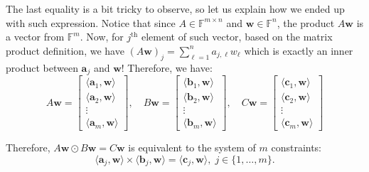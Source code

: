 \documentclass[../lecture-notes.tex]{subfiles}
\begin{document}
The last equality is a bit tricky to observe, so let us explain how we ended up with such expression. Notice that since $A \in \mathbb{F}^{m \times n}$ and $\mathbf{w} \in \mathbb{F}^n$, the product $A\mathbf{w}$ is a vector from $\mathbb{F}^m$. Now, for $j^{\text{th}}$ element of such vector, based on the matrix product definition, we have $(A\mathbf{w})_j = \sum_{\ell=1}^na_{j,\ell}w_{\ell}$ which is exactly an inner product between $\mathbf{a}_j$ and $\mathbf{w}$! Therefore, we have:
\begin{equation*}
    A\mathbf{w} = \begin{bmatrix}
        \langle \mathbf{a}_1, \mathbf{w}\rangle \\
        \langle \mathbf{a}_2, \mathbf{w}\rangle \\
        \vdots \\
        \langle \mathbf{a}_m, \mathbf{w}\rangle 
    \end{bmatrix}, \quad
    B\mathbf{w} = \begin{bmatrix}
        \langle \mathbf{b}_1, \mathbf{w}\rangle \\
        \langle \mathbf{b}_2, \mathbf{w}\rangle \\
        \vdots \\
        \langle \mathbf{b}_m, \mathbf{w}\rangle 
    \end{bmatrix}, \quad
    C\mathbf{w} = \begin{bmatrix}
        \langle \mathbf{c}_1, \mathbf{w}\rangle \\
        \langle \mathbf{c}_2, \mathbf{w}\rangle \\
        \vdots \\
        \langle \mathbf{c}_m, \mathbf{w}\rangle 
    \end{bmatrix}
\end{equation*}

Therefore, $A\mathbf{w} \odot B\mathbf{w} = C\mathbf{w}$ is equivalent to the system of $m$ constraints:
\begin{equation*}
    \langle \mathbf{a}_j, \mathbf{w}\rangle \times \langle \mathbf{b}_j, \mathbf{w} \rangle = \langle \mathbf{c}_j, \mathbf{w} \rangle, \; j \in \{1,\dots,m\}.
\end{equation*}

\vspace{10px}
\end{document}
